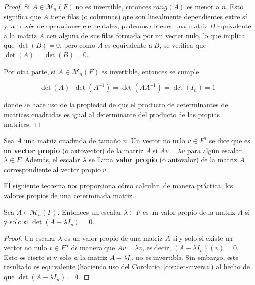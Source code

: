 \begin{proof}
    Si $A \in \mathcal{M}_{n}(F)$ no es invertible, entonces $rang(A)$ es menor a $n$. Esto significa que $A$ tiene filas (o columnas) que son linealmente dependientes entre sí y, a través de operaciones elementales, podemos obtener una matriz $B$ equivalente a la matriz $A$ con alguna de sus filas formada por un vector nulo, lo que implica que $\det(B) = 0$, pero como $A$ es equivalente a $B$, se verifica que $\det(A) = \det(B) = 0$.\newline

    Por otra parte, si $A \in \mathcal{M}_{n}(F)$ es invertible, entonces se cumple

    \[ \det(A)\cdot\det(A^{-1}) = \det(AA^{-1}) = \det(I_n)=1\]

    donde se hace uso de la propiedad de que el producto de determinantes de matrices cuadradas es igual al determinante del producto de las propias matrices.\newline
\end{proof}

\begin{definicion}
    Sea $A$ una matriz cuadrada de tamaño $n$. Un vector no nulo $v \in F^{n}$ se dice que es un \textbf{vector propio} (o autovector) de la matriz $A$ si $Av=\lambda v$ para algún escalar $\lambda \in F$. Además, el escalar $\lambda$ se llama \textbf{valor propio} (o autovalor) de la matriz $A$ correspondiente al vector propio $v$.\newline
\end{definicion}

El siguiente teorema nos proporciona cómo calcular, de manera práctica, los valores propios de una determinada matriz.
\begin{teorema}
    Sea $A \in \mathcal{M}_{n}(F)$. Entonces un escalar $\lambda \in F$ es un valor propio de la matriz $A$ si y solo si $\det(A - \lambda I_n) = 0$. 
\end{teorema}

\begin{proof}
    Un escalar $\lambda$ es un valor propio de una matriz $A$ si y solo si existe un vector no nulo $v \in F^{n}$ de manera que $Av = \lambda v$, es decir, $(A - \lambda I_n)(v) = 0$. Esto es cierto si y solo si la matriz $A - \lambda I_n$ no es invertible. Sin embargo, este resultado es equivalente (haciendo uso del Corolario~\ref{cor:det-inversa}) al hecho de que $\det(A - \lambda I_n) = 0$.\newline
\end{proof}


